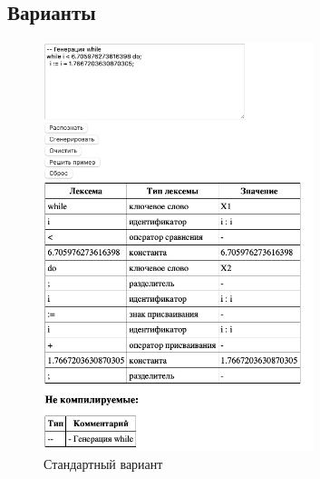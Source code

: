 \documentclass[areasetadvanced]{scrartcl}
\begin{document}
\subsection{Варианты}
\begin{figure}[H]
    \centering
    \includegraphics[width=0.7\textwidth]{Original.png}
    \caption{Стандартный вариант}
    \label{fig:syntdiag}
\end{figure}
\end{document}
